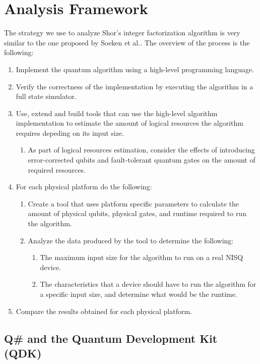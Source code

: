 %
%
\chapter {Analysis Framework}

The strategy we use to analyze Shor's integer factorization algorithm is very similar to the one proposed by Soeken et al.\cite{ResourceEstimationFramework_Soeken_2021}. The overview of the process is the following:
\begin{enumerate}
    \item Implement the quantum algorithm using a high-level programming language.
    \item Verify the correctness of the implementation by executing the algorithm in a full state simulator.
    \item Use, extend and build tools that can use the high-level algorithm implementation to estimate the amount of logical resources the algorithm requires depeding on its input size.
    \begin{enumerate}
        \item As part of logical resources estimation, consider the effects of introducing error-corrected qubits and fault-tolerant quantum gates on the amount of required resources.
    \end{enumerate}
    \item For each physical platform do the following:
    \begin{enumerate}
        \item Create a tool that uses platform specific parameters to calculate the amount of physical qubits, physical gates, and runtime required to run the algorithm.
        \item Analyze the data produced by the tool to determine the following:
        \begin{enumerate}
            \item The maximum input size for the algorithm to run on a real NISQ device.
            \item The characteristics that a device should have to run the algorithm for a specific input size, and determine what would be the runtime.
        \end{enumerate}
    \end{enumerate}
    \item Compare the results obtained for each physical platform.
\end{enumerate}

\section{Q\# and the Quantum Development Kit (QDK)}


